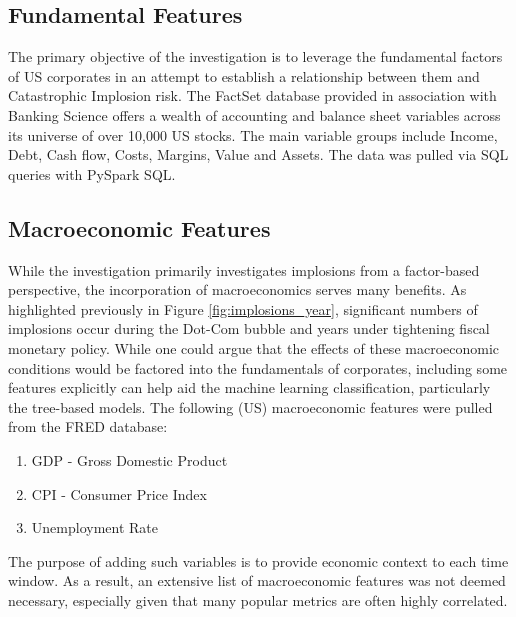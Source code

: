 \documentclass[a4paper]{report}
\begin{document}
\subsection{Fundamental Features}
The primary objective of the investigation is to leverage the fundamental factors of US corporates in an attempt to establish a relationship between them and Catastrophic Implosion risk. The FactSet database provided in association with Banking Science
offers a wealth of accounting and balance sheet variables across its universe of over 10,000 US stocks. The main variable groups include Income, Debt, Cash flow, Costs, Margins, Value and Assets. The data was pulled via SQL queries with PySpark SQL. 

\subsection{Macroeconomic Features}
While the investigation primarily investigates implosions from a factor-based perspective, the incorporation of macroeconomics serves many benefits. As highlighted previously in Figure \ref{fig:implosions_year}, 
significant numbers of implosions occur during the Dot-Com bubble and years under tightening fiscal monetary policy. While one could argue that the effects of these macroeconomic conditions would be factored 
into the fundamentals of corporates, including some features explicitly can help aid the machine learning classification, particularly the tree-based models. The following (US) macroeconomic
features were pulled from the FRED database:
\begin{enumerate}
  \item GDP - Gross Domestic Product
  \item CPI - Consumer Price Index
  \item Unemployment Rate
\end{enumerate}
The purpose of adding such variables is to provide economic context to each time window. As a result, an extensive list of macroeconomic features was not deemed necessary, especially given that many popular metrics are often highly correlated.
\end{document}
